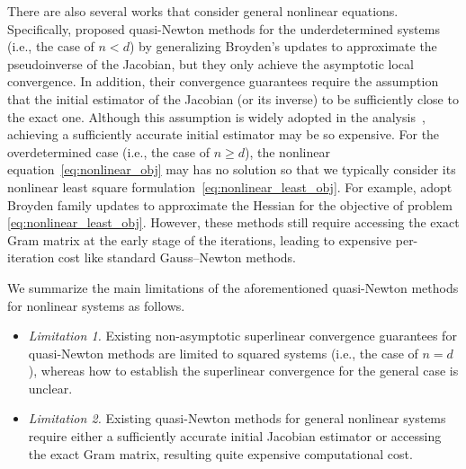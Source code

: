\documentclass[11pt]{article}
\theoremstyle{plain}
\theoremstyle{definition}
\theoremstyle{remark}
\theoremstyle{plain}
\begin{document}
There are also several works that consider general nonlinear equations. 
Specifically, \citet{martinez1991quasi,vater2024convergence} proposed quasi-Newton methods for the underdetermined systems (i.e., the case of $n<d$) by generalizing Broyden's updates to approximate the pseudoinverse of the Jacobian, but they only achieve the asymptotic local convergence.
In addition, their convergence guarantees require the assumption that the initial estimator of the Jacobian (or its inverse) to be sufficiently close to the exact one.
Although this assumption is widely adopted in the analysis~\citep{asl2024aj,martinez1991quasi,vater2024convergence,liu2023block}, 
achieving a sufficiently accurate initial estimator may be so expensive.
For the overdetermined case (i.e., the case of $n\geq d$), the nonlinear equation~\eqref{eq:nonlinear_obj} may has no solution so that we typically consider its nonlinear least square formulation~\eqref{eq:nonlinear_least_obj}.
For example, \citet{yabe1991factorized,eriksson1999quasi,zhou2010global} adopt Broyden family updates to approximate the Hessian for the objective of problem \eqref{eq:nonlinear_least_obj}.
However, these methods still require accessing the exact Gram matrix at the early stage of the iterations, leading to expensive per-iteration cost like standard Gauss--Newton methods.

We summarize the main limitations of the aforementioned quasi-Newton methods for nonlinear systems as follows.
\begin{itemize}[leftmargin=*,label={}]
\item \emph{Limitation 1.} Existing non-asymptotic superlinear convergence guarantees for quasi-Newton methods are limited to squared systems (i.e., the case of $n=d$), whereas how to establish the superlinear convergence for the general case is unclear.
\item \emph{Limitation 2.} Existing quasi-Newton methods for general nonlinear systems require either a sufficiently accurate initial Jacobian estimator or accessing the exact Gram matrix, resulting quite expensive computational cost.
\end{itemize}
\end{document}
